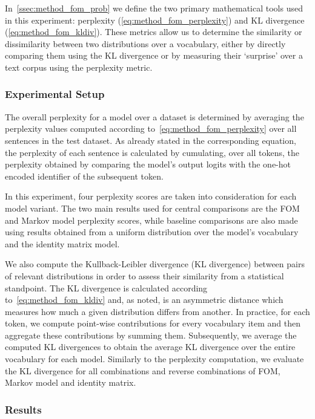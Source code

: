 In~\cref{ssec:method_fom_prob} we define the two primary mathematical tools used in this experiment: perplexity (\cref{eq:method_fom_perplexity}) and KL divergence (\cref{eq:method_fom_kldiv}).
These metrics allow us to determine the similarity or dissimilarity between two distributions over a vocabulary, either by directly comparing them using the KL divergence or by measuring their `surprise' over a text corpus using the perplexity metric.

\subsubsection{Experimental Setup}

The overall perplexity for a model over a dataset is determined by averaging the perplexity values computed according to~\cref{eq:method_fom_perplexity} over all sentences in the test dataset.
As already stated in the corresponding equation, the perplexity of each sentence is calculated by cumulating, over all tokens, the perplexity obtained by comparing the model's output logits with the one-hot encoded identifier of the subsequent token.

In this experiment, four perplexity scores are taken into consideration for each model variant.
The two main results used for central comparisons are the FOM and Markov model perplexity scores, while baseline comparisons are also made using results obtained from a uniform distribution over the model's vocabulary and the identity matrix model.

We also compute the Kullback-Leibler divergence (KL divergence) between pairs of relevant distributions in order to assess their similarity from a statistical standpoint.
The KL divergence is calculated according to~\cref{eq:method_fom_kldiv} and, as noted, is an asymmetric distance which measures how much a given distribution differs from another.
In practice, for each token, we compute point-wise contributions for every vocabulary item and then aggregate these contributions by summing them.
Subsequently, we average the computed KL divergences to obtain the average KL divergence over the entire vocabulary for each model.
Similarly to the perplexity computation, we evaluate the KL divergence for all combinations and reverse combinations of FOM, Markov model and identity matrix.

\subsubsection{Results}

